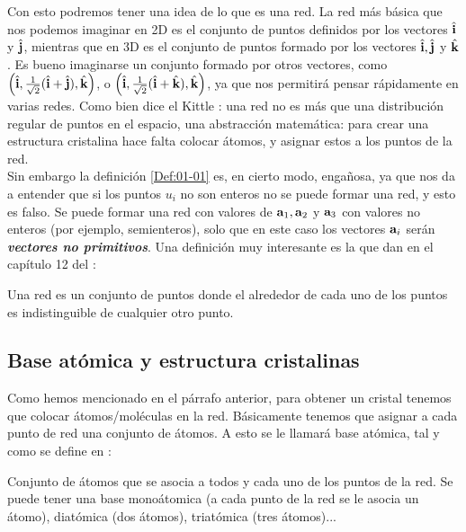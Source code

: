Con esto podremos tener una idea de lo que es una red. La red más básica que nos podemos imaginar en 2D es el conjunto de puntos definidos por los vectores $\hat{\mathbf{i}}$ y $\hat{\mathbf{j}}$, mientras que en 3D es el conjunto de puntos formado por los vectores $\hat{\mathbf{i}},\hat{\mathbf{j}}$ y $\hat{\mathbf{k}}$. Es bueno imaginarse un conjunto formado por otros vectores, como $\left( \hat{\mathbf{i}},\frac{1}{\sqrt{2}} (\hat{\mathbf{i}} +\hat{\mathbf{j}}),\hat{\mathbf{k}} \right)$, o $\left( \hat{\mathbf{i}},\frac{1}{\sqrt{2}} (\hat{\mathbf{i}} +\hat{\mathbf{k}}),\hat{\mathbf{k}} \right)$, ya que nos permitirá pensar rápidamente en varias redes. Como bien dice el Kittle \cite{Estado_Solido_Kittel}:  una red no es más que una distribución regular de puntos en el espacio, una abstracción matemática: para crear una estructura cristalina hace falta colocar átomos, y asignar estos a los puntos de la red. \\

Sin embargo la definición \ref{Def:01-01} es, en cierto modo, engañosa, ya que nos da a entender que si los puntos $u_i$ no son enteros no se puede formar una red, y esto es falso. Se puede formar una red con valores de $\mathbf{a}_1,\mathbf{a}_2$ y $\mathbf{a}_3$ con valores no enteros (por ejemplo, semienteros), solo que en este caso los vectores $\mathbf{a}_i$ serán \textit{\textbf{vectores no primitivos}}. Una definición muy interesante es la que dan en el capítulo 12 del \cite{Oxford_Solid_State}:

\begin{definition_equivalente}
	Una red es un conjunto de puntos donde el alrededor de cada uno de los puntos es indistinguible de cualquier otro punto.
\end{definition_equivalente}


\subsection{Base atómica y estructura cristalinas}

Como hemos mencionado en el párrafo anterior, para obtener un cristal tenemos que colocar átomos/moléculas en la red. Básicamente tenemos que asignar a cada punto de red una conjunto de átomos. A esto se le llamará base atómica, tal y como se define en \cite{Fisica_del_Estado_Solido}:

\begin{definition}
    Conjunto de átomos que se asocia a todos y cada uno de los puntos de la red. Se puede tener una base monoátomica (a cada punto de la red se le asocia un átomo), diatómica (dos átomos), triatómica (tres átomos)...
    \label{Def:01-Base_atomica}
\end{definition}

